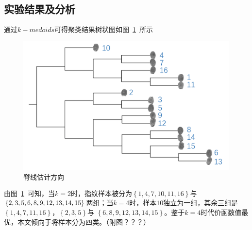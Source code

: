 \documentclass{whutmod}
\begin{document}
\begin{itemize}
  	\subsection{实验结果及分析}
  	通过$k-medoids$可得聚类结果树状图如图~\ref{bgbgbg}~所示
  	\begin{figure}[H]
  		\centering
  		\includegraphics[width=\textwidth]{figures/tree.png}
  		\caption{脊线估计方向}\label{bgbgbg}
  	\end{figure}
  	由图~\ref{bgbgbg}~可知，当$k=2$时，指纹样本被分为$\left \{ 1,4,7,10,11,16 \right \}$与$\left \{ 2,3,5,6,8,9,\\
  	12,13,14,15 \right \}$两组；当$k=4$时，样本$10$独立为一组，其余三组是$\left \{ 1,4,7,11,16 \right \}$，$\left \{ 2,3,5   \right \}$与 $\left \{ 6,8,9,12,13,14,15 \right \}$。鉴于$k=4$时代价函数值最优，本文倾向于将样本分为四类。（附图？？？）
  	

\end{itemize}
\end{document}

